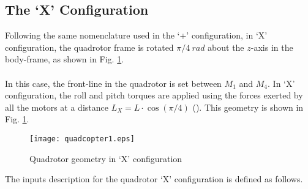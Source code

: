 \subsection{The `X' Configuration}
Following the same nomenclature used in the `+' configuration, in `X' configuration, the quadrotor frame is rotated $\pi/4\ rad$ about the $z$-axis in the body-frame, as shown in Fig. \ref{fig:quadrotorX}. 
\\\\
In this case, the front-line in the quadrotor is set between $M_1$ and $M_4$. In `X' configuration, the roll and pitch torques are applied using the forces exerted by all the motors at a distance $L_X = L\cdot \cos(\pi/4)$ (\cite{Faessler2016}).  This geometry is shown in Fig. \ref{fig:quadrotorX}.
\begin{figure}[H]
\begin{center}
  \texttt{[image: quadcopter1.eps]}
\caption{Quadrotor geometry in `X' configuration} 
    \label{fig:quadrotorX}
    \end{center}
\end{figure}
The inputs description for the quadrotor `X' configuration is defined as follows.
